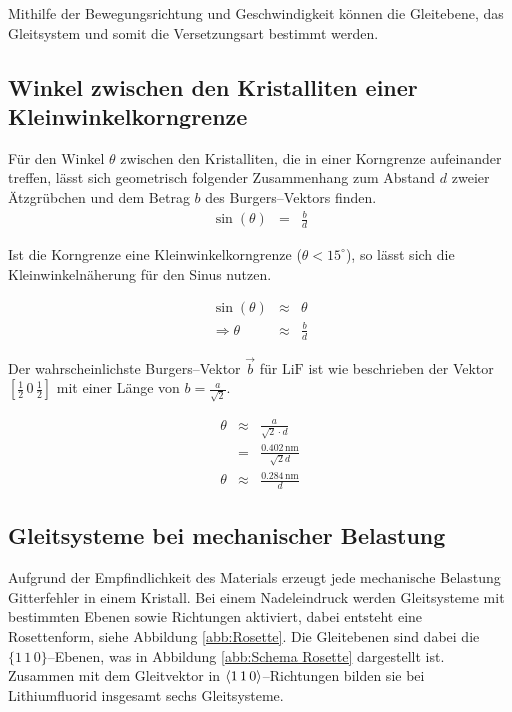\documentclass[12pt,a4paper]{scrartcl}
\numberwithin{equation}{section} %
\begin{document}
Mithilfe der Bewegungsrichtung und Geschwindigkeit können die Gleitebene, das Gleitsystem und somit die Versetzungsart bestimmt werden.

\hypertarget{winkel-zwischen-den-kristalliten-einer-kleinwinkelkorngrenze}{%
\subsection{Winkel zwischen den Kristalliten einer
Kleinwinkelkorngrenze}\label{winkel-zwischen-den-kristalliten-einer-kleinwinkelkorngrenze}}

Für den Winkel $\theta$ zwischen den Kristalliten, die in einer
Korngrenze aufeinander treffen, lässt sich geometrisch folgender
Zusammenhang zum Abstand $d$ zweier Ätzgrübchen und dem Betrag $b$ des Burgers--Vektors finden.
\begin{eqnarray}
    \sin(\theta) &=& \frac{b}{d}
\end{eqnarray}

\noindent
Ist die Korngrenze eine Kleinwinkelkorngrenze ($\theta < 15^\circ$), so lässt sich die Kleinwinkelnäherung für den Sinus nutzen.

\begin{eqnarray}
    \sin(\theta) &\approx& \theta \\
    \Rightarrow \theta &\approx& \frac{b}{d}
\end{eqnarray}

\noindent
Der wahrscheinlichste Burgers--Vektor $\vec{b}$ für $\mathrm{LiF}$ ist wie beschrieben der Vektor $[\frac{1}{2}\,0\,\frac{1}{2}]$ mit einer Länge von $b = \frac{a}{\sqrt{2}}$.

\begin{eqnarray}
    \theta &\approx& \frac{a}{\sqrt{2} \cdot d} \\
        &=& \frac{0.402\,\mathrm{nm}}{\sqrt{2} d}\\
    \theta &\approx& \frac{0.284\,\mathrm{nm}}{d} \label{theta}
\end{eqnarray}

\hypertarget{gleitsysteme-bei-mechanischer-belastung}{%
\subsection{Gleitsysteme bei mechanischer
Belastung}\label{gleitsysteme-bei-mechanischer-belastung}}

Aufgrund der Empfindlichkeit des Materials erzeugt jede mechanische Belastung Gitterfehler in einem Kristall. Bei einem Nadeleindruck werden
Gleitsysteme mit bestimmten Ebenen sowie Richtungen aktiviert, dabei entsteht eine Rosettenform, siehe Abbildung \ref{abb:Rosette}. Die Gleitebenen sind dabei die $\lbrace1\,1\,0\rbrace$--Ebenen, was in Abbildung \ref{abb:Schema Rosette} dargestellt ist. Zusammen mit dem Gleitvektor in $\expval{1\,1\,0}$--Richtungen bilden sie bei Lithiumfluorid insgesamt sechs Gleitsysteme.
\end{document}
